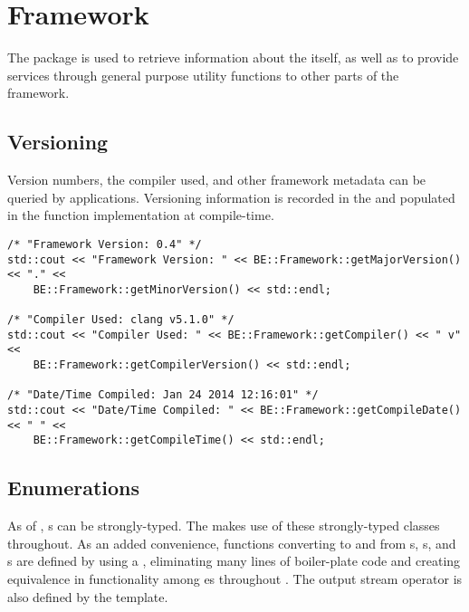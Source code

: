 %
%
\chapter{Framework}
\label{chp-framework}

The  package is used to retrieve information about the
\lname itself, as well as to provide services through general purpose utility
functions to other parts of the framework.

\section{Versioning}
Version numbers, the compiler used, and other framework metadata
can be queried by applications.  Versioning information is recorded in the
\sname {} and populated in the function implementation at
compile-time.

\begin{lstlisting}[caption={Using the \namespace{Framework} API}, label=frameworkuse]
/* "Framework Version: 0.4" */
std::cout << "Framework Version: " << BE::Framework::getMajorVersion() << "." <<
    BE::Framework::getMinorVersion() << std::endl;

/* "Compiler Used: clang v5.1.0" */
std::cout << "Compiler Used: " << BE::Framework::getCompiler() << " v" <<
    BE::Framework::getCompilerVersion() << std::endl;

/* "Date/Time Compiled: Jan 24 2014 12:16:01" */
std::cout << "Date/Time Compiled: " << BE::Framework::getCompileDate() << " " <<
    BE::Framework::getCompileTime() << std::endl;
\end{lstlisting}

\section{Enumerations}
\label{sec_framework-enumerations}

As of \CppXI, s can be strongly-typed. The \lname makes use of
these strongly-typed  classes throughout. As an added convenience,
functions converting to and from s, s, and s
are defined by using a , eliminating many lines
of boiler-plate code and creating equivalence in functionality among
es throughout \sname. The output stream operator \code{<<} is
also defined by the template.

